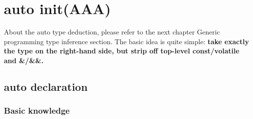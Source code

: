 \documentclass[a4paper,12pt,twoside]{book}
\begin{document}
\section{auto init(AAA)}

About the auto type deduction, please refer to the next chapter Generic programming type inference section. The basic idea is quite simple: \newline 
\textbf{take exactly the type on the right-hand side, but strip off top-level const/volatile and \&/\&\&.}

\subsection{auto declaration}
\subsubsection{Basic knowledge}
\end{document}
